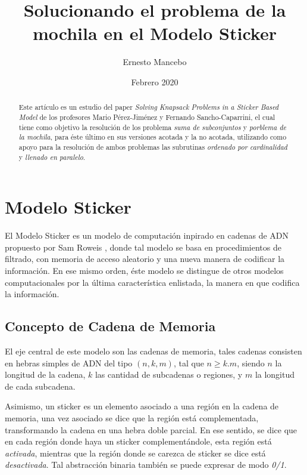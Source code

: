 \documentclass[12pt, letterpaper, twoside]{article}
\title{Solucionando el problema de la mochila en el Modelo Sticker}
\author{Ernesto Mancebo}
\date{Febrero 2020}
\begin{document}
    \maketitle
    \begin{abstract}
        Este artículo es un estudio del paper \emph{Solving Knapsack Problems in a Sticker Based Model} de los profesores Mario P{\'e}rez-Jim{\'e}nez y Fernando Sancho-Caparrini\autocite{ref10.1007/3-540-48017-X_15}, el cual tiene como objetivo la resolución de los problema \emph{suma de subconjuntos} y \emph{porblema de la mochila}, para éste último en sus versiones acotada y la no acotada, utilizando como apoyo para la resolución de ambos problemas las subrutinas \emph{ordenado por cardinalidad} y \emph{llenado en paralelo}.
    \end{abstract}

    \newpage
    \tableofcontents

    \newpage
    \section{Modelo Sticker}
    El Modelo Sticker es un modelo de computación inpirado en cadenas de ADN propuesto por Sam Roweis \autocite{sticker_model}, donde tal modelo se basa en procedimientos de filtrado, con memoria de acceso aleatorio y una nueva manera de codificar la información. En ese mismo orden, éste modelo se distingue de otros modelos computacionales por la última característica enlistada, la manera en que codifica la información.

    \subsection{Concepto de Cadena de Memoria}
    El eje central de este modelo son las cadenas de memoria, tales cadenas consisten en hebras simples de ADN del tipo $(n, k, m)$, tal que $n\geq k.m$, siendo $n$ la longitud de la cadena, $k$ las cantidad de subcadenas o regiones, y $m$ la longitud de cada subcadena.

    Asimismo, un sticker es un elemento asociado a una región en la cadena de memoria, una vez asociado se dice que la región está complementada, transformando la cadena en una hebra doble parcial. En ese sentido, se dice que en cada región donde haya un sticker complementándole, esta región está \emph{activada}, mientras que la región donde se carezca de sticker se dice está \emph{desactivada}. Tal abstracción binaria también se puede expresar de modo \emph{0/1}.
\end{document}
